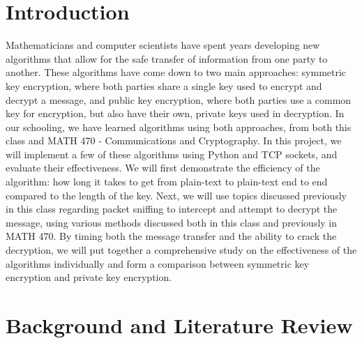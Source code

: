 \documentclass{report}
\begin{document}
\section{Introduction}
Mathematicians and computer scientists have spent years developing new algorithms that allow for the safe transfer of information from one party to another. These algorithms have come down to two main approaches: symmetric key encryption, where both parties share a single key used to encrypt and decrypt a message, and public key encryption, where both parties use a common key for encryption, but also have their own, private keys used in decryption. In our schooling, we have learned algorithms using both approaches, from both this class and MATH 470 - Communications and Cryptography. In this project, we will implement a few of these algorithms using Python and TCP sockets, and evaluate their effectiveness. We will first demonstrate the efficiency of the algorithm: how long it takes to get from plain-text to plain-text end to end compared to the length of the key. Next, we will use topics discussed previously in this class regarding packet sniffing to intercept and attempt to decrypt the message, using various methods discussed both in this class and previously in MATH 470. By timing both the message transfer and the ability to crack the decryption, we will put together a comprehensive study on the effectiveness of the algorithms individually and form a comparison between symmetric key encryption and private key encryption.

\section{Background and Literature Review}

\iffalse
\newpage

\begin{thebibliography}{9}

    \bibitem{ieee}
    IEEE-CS/ACM Joint Task Force on Software Engineering Ethics and Professional Practices\\
    \texttt{https://www.computer.org/web/education/code-of-ethics}

\end{thebibliography}
\fi
\end{document}
